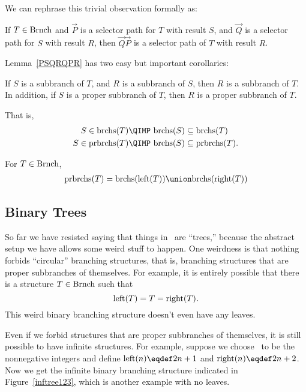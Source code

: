 We can rephrase this trivial observation formally as:
\begin{lemma}\label{PSQRQPR}
If $T \in \text{Brnch}$ and $\vec{P}$ is a selector path for $T$ with result
$S$, and $\vec{Q}$ is a selector path for $S$ with result $R$, then
$\vec{Q}\vec{P}$ is a selector path of $T$ with result $R$.
\end{lemma}

Lemma~\ref{PSQRQPR} has two easy but important corollaries:
\begin{corollary}\label{propsubbranch}
If $S$ is a subbranch of $T$, and $R$ is a subbranch of $S$, then $R$
is a subbranch of $T$.  In addition, if $S$ is a proper subbranch of
$T$, then $R$ is a proper subbranch of $T$.

That is,
\begin{align*}
 S \in \subbrn{T} & \QIMP\ \subbrn{S} \subseteq \subbrn{T}\\
 S \in \propbrn{T} & \QIMP\ \subbrn{S} \subseteq \propbrn{T}.
 \end{align*}
\end{corollary}

\begin{corollary}\label{unionLR}
For $T \in \text{Brnch}$,
\begin{align*}
\propbrn{T} = \subbrn{\leftsub{T}} \union \subbrn{\rightsub{T}}
\end{align*}
\end{corollary}

\subsection{Binary Trees}

So far we have resisted saying that things in \brnch\ are ``trees,''
because the abstract setup we have allows some weird stuff to happen.
One weirdness is that nothing forbids ``circular'' branching
structures, that is, branching structures that are proper subbranches
of themselves.  For example, it is entirely possible that there is a
structure $T \in \text{Brnch}$ such that \textcolor{red}{
\[
\text{left}(T) = T = \text{right}(T).
\]}
This weird binary branching structure doesn't even have any leaves.

Even if we forbid structures that are proper subbranches of
themselves, it is still possible to have infinite structures.  For
example, suppose we choose \brnch\ to be the nonnegative integers and
define $\leftsub{n} \eqdef 2n+1$ and $\rightsub{n} \eqdef 2n+2$.  Now we
get the infinite binary branching structure indicated in
Figure~\ref{inftree123}, which is another example with no leaves.

